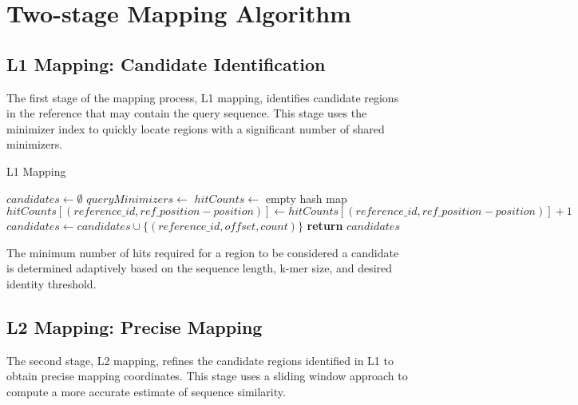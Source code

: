 \documentclass{article}
\begin{document}
\section{Two-stage Mapping Algorithm}

\subsection{L1 Mapping: Candidate Identification}

The first stage of the mapping process, L1 mapping, identifies candidate regions in the reference that may contain the query sequence. This stage uses the minimizer index to quickly locate regions with a significant number of shared minimizers.

\begin{algorithm}
\caption{L1 Mapping}
\begin{algorithmic}[1]
\State $candidates \gets \emptyset$
\State $queryMinimizers \gets$ 
\State $hitCounts \gets$ empty hash map
            \State $hitCounts[(reference\_id, ref\_position - position)] \gets hitCounts[(reference\_id, ref\_position - position)] + 1$
        \EndFor
    \EndIf
\EndFor
{}
        \State $candidates \gets candidates \cup \{(reference\_id, offset, count)\}$
    \EndIf
\EndFor
\State \textbf{return} $candidates$
\EndProcedure
\end{algorithmic}
\end{algorithm}

The minimum number of hits required for a region to be considered a candidate is determined adaptively based on the sequence length, k-mer size, and desired identity threshold.

\subsection{L2 Mapping: Precise Mapping}

The second stage, L2 mapping, refines the candidate regions identified in L1 to obtain precise mapping coordinates. This stage uses a sliding window approach to compute a more accurate estimate of sequence similarity.
\end{document}
